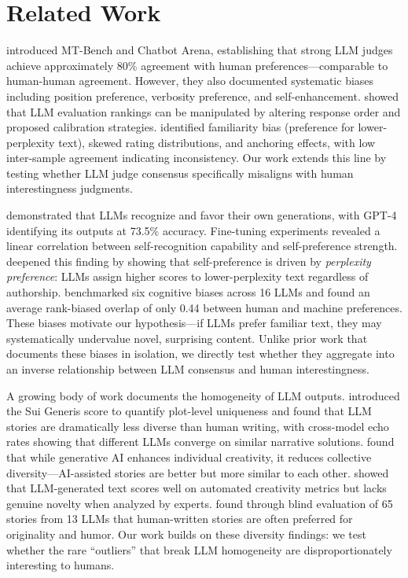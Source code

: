 \section{Related Work}
\label{sec:related}

\citet{zheng2023judging} introduced MT-Bench and Chatbot Arena, establishing that strong LLM judges achieve approximately 80\% agreement with human preferences---comparable to human-human agreement.
However, they also documented systematic biases including position preference, verbosity preference, and self-enhancement.
\citet{wang2023large} showed that LLM evaluation rankings can be manipulated by altering response order and proposed calibration strategies.
\citet{stureborg2024large} identified familiarity bias (preference for lower-perplexity text), skewed rating distributions, and anchoring effects, with low inter-sample agreement indicating inconsistency.
Our work extends this line by testing whether LLM judge consensus specifically misaligns with human interestingness judgments.

\citet{panickssery2024llm} demonstrated that LLMs recognize and favor their own generations, with GPT-4 identifying its outputs at 73.5\% accuracy.
Fine-tuning experiments revealed a linear correlation between self-recognition capability and self-preference strength.
\citet{wataoka2024self} deepened this finding by showing that self-preference is driven by \emph{perplexity preference}: LLMs assign higher scores to lower-perplexity text regardless of authorship.
\citet{koo2023cobbler} benchmarked six cognitive biases across 16 LLMs and found an average rank-biased overlap of only 0.44 between human and machine preferences.
These biases motivate our hypothesis---if LLMs prefer familiar text, they may systematically undervalue novel, surprising content.
Unlike prior work that documents these biases in isolation, we directly test whether they aggregate into an inverse relationship between LLM consensus and human interestingness.

A growing body of work documents the homogeneity of LLM outputs.
\citet{echoes2024} introduced the Sui Generis score to quantify plot-level uniqueness and found that LLM stories are dramatically less diverse than human writing, with cross-model echo rates showing that different LLMs converge on similar narrative solutions.
\citet{doshi2024generative} found that while generative AI enhances individual creativity, it reduces collective diversity---AI-assisted stories are better but more similar to each other.
\citet{chakrabarty2023art} showed that LLM-generated text scores well on automated creativity metrics but lacks genuine novelty when analyzed by experts.
\citet{gomez2023confederacy} found through blind evaluation of 65 stories from 13 LLMs that human-written stories are often preferred for originality and humor.
Our work builds on these diversity findings: we test whether the rare ``outliers'' that break LLM homogeneity are disproportionately interesting to humans.

